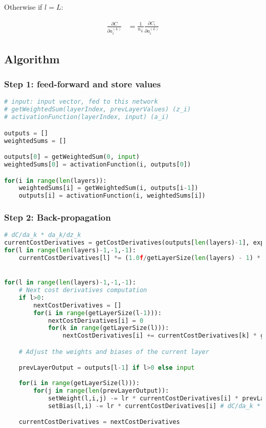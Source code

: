 \documentclass[11pt,a4paper]{report}
\begin{document}
Otherwise if $l=L$:

\begin{equation*}
\begin{split}
    \frac{\partial C}{\partial a_i^{(L)}} &= \frac{1}{n_{L}}\frac{\partial C_i}{\partial a_i^{(L)}}
\end{split}
\end{equation*}

\subsection{Algorithm}

\subsubsection{Step 1: feed-forward and store values}

\begin{lstlisting}[language=Python]
# input: input vector, fed to this network
# getWeightedSum(layerIndex, prevLayerValues) (z_i)
# activationFunction(layerIndex, input) (a_i)

outputs = []
weightedSums = []

outputs[0] = getWeightedSum(0, input)
weightedSums[0] = activationFunction(i, outputs[0])

for(i in range(len(layers)):
    weightedSums[i] = getWeightedSum(i, outputs[i-1])
    outputs[i] = activationFunction(i, weightedSums[i])
\end{lstlisting}

\newpage
\subsubsection{Step 2: Back-propagation}
\begin{lstlisting}[language=Python]
# dC/da_k * da_k/dz_k
currentCostDerivatives = getCostDerivatives(outputs[len(layers)-1], expectedOutput) # dC/da_k
for(l in range(len(layers)-1,-1,-1):
    currentCostDerivatives[l] *= (1.0f/getLayerSize(len(layers) - 1) * activationDerivatives[l];


for(l in range(len(layers)-1,-1,-1):
    # Next cost derivatives computation
    if l>0:
        nextCostDerivatives = []
        for(i in range(getLayerSize(l-1))):
            nextCostDerivatives[i] = 0
            for(k in range(getLayerSize(l))):
                nextCostDerivatives[i] += currentCostDerivatives[k] * getWeight(l,k,i) # dC/da_k * da_k/dz_k * dz_k/da_i

    # Adjust the weights and biases of the current layer

    prevLayerOutput = outputs[l-1] if l>0 else input
    
    for(i in range(getLayerSize(l))):
        for(j in range(len(prevLayerOutput)):
            setWeight(l,i,j) -= lr * currentCostDerivatives[i] * prevLayerOutput[j] # lr = learning rate and we have dC/da_k * da_k/dz_k * dz_k/dw_i,j
            setBias(l,i) -= lr * currentCostDerivatives[i] # dC/da_k * da_k/dz_k

    currentCostDerivatives = nextCostDerivatives
   
\end{lstlisting}
\end{document}
